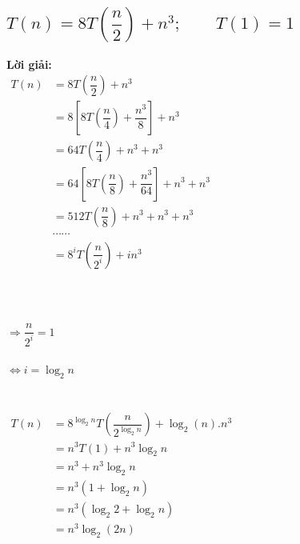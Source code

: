 \documentclass[12pt, letterpaper]{article}
\begin{document}
\subsection{$T(n) = 8T(\dfrac{n}{2}) + n^3; \quad \quad T(1) = 1$}
\textbf{Lời giải:} \\
$ \begin{aligned}
		T(n) & = 8T(\dfrac{n}{2}) + n^3                             \\
		     & = 8[8T(\dfrac{n}{4}) + \dfrac{n^3}{8}] + n^3         \\
		     & = 64T(\dfrac{n}{4}) + n^3 + n^3                      \\
		     & = 64[8T(\dfrac{n}{8}) + \dfrac{n^3}{64}] + n^3 + n^3 \\
		     & = 512T(\dfrac{n}{8}) + n^3 + n^3 + n^3               \\
		     & \cdots \cdots                                        \\
		     & = 8^iT(\dfrac{n}{2^i}) + in^3                        \\
	\end{aligned} $ \\ \\ \\
 \\
$\Rightarrow \dfrac{n}{2^i} = 1$ \\ \\
$\Leftrightarrow i = \log_2{n}$ \\ \\
 \\
$ \begin{aligned}
		T(n) & = 8^{\log_2{n}}T(\dfrac{n}{2^{\log_2{n}}}) + \log_2(n).n^3 \\
		     & = n^3T(1) + n^3\log_2{n}                                   \\
		     & = n^3 + n^3\log_2{n}                                       \\
		     & = n^3(1 + \log_2{n})                                       \\
		     & = n^3(\log_2{2} + \log_2{n})                               \\
		     & = n^3\log_2(2n)
	\end{aligned} $

\end{document}
